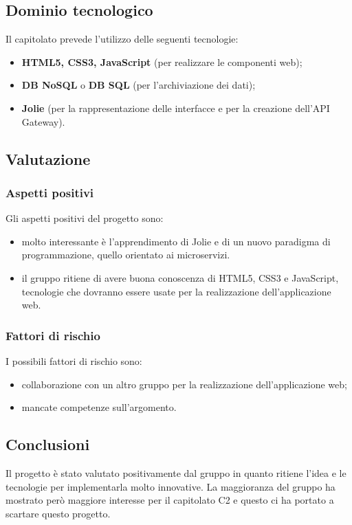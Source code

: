 	\subsection {Dominio tecnologico}
		Il capitolato prevede l'utilizzo delle seguenti tecnologie:
		\begin {itemize}
			\item \textbf{HTML5, CSS3, JavaScript} (per realizzare le componenti web);
			\item \textbf{DB NoSQL} o \textbf{DB SQL} (per l'archiviazione dei dati);
			\item \textbf{Jolie} (per la rappresentazione delle interfacce e per la creazione dell'API Gateway).
		\end {itemize}
	\subsection {Valutazione}
		\subsubsection {Aspetti positivi}
		Gli aspetti positivi del progetto sono:
			\begin{itemize}
				\item molto interessante è l'apprendimento di Jolie e di un nuovo paradigma di programmazione, quello orientato ai microservizi.
				\item il gruppo ritiene di avere buona conoscenza di HTML5, CSS3 e JavaScript, tecnologie che dovranno essere usate per la realizzazione dell'applicazione web.
			\end{itemize}
		\subsubsection {Fattori di rischio}
		I possibili fattori di rischio sono:
			\begin{itemize}
				\item collaborazione con un altro gruppo per la realizzazione dell'applicazione web;
				\item mancate competenze sull'argomento.
			\end{itemize}
	\subsection {Conclusioni}
		Il progetto è stato valutato positivamente dal gruppo in quanto ritiene l'idea e le tecnologie per implementarla molto innovative. La maggioranza del gruppo ha mostrato però maggiore interesse
		per il capitolato C2 e questo ci ha portato a scartare questo progetto.
